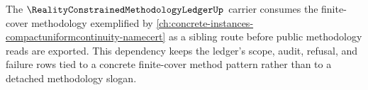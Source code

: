 The $\RealityConstrainedMethodologyLedgerUp$ carrier consumes the finite-cover methodology exemplified by \autoref{ch:concrete-instances-compactuniformcontinuity-namecert} as a sibling route before public methodology reads are exported. This dependency keeps the ledger's scope, audit, refusal, and failure rows tied to a concrete finite-cover method pattern rather than to a detached methodology slogan.

